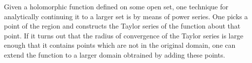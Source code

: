 \documentclass[12pt]{article}
\begin{document}
Given a holomorphic function defined on some open set, one technique
for analytically continuing it to a larger set is by means of power
series.  One picks a point of the region and constructs the Taylor
series of the function about that point.  If it turns out that the
radius of convergence of the Taylor series is large enough that it
contains points which are not in the original domain, one can
extend the function to a larger domain obtrained by adding these points.
\end{document}
